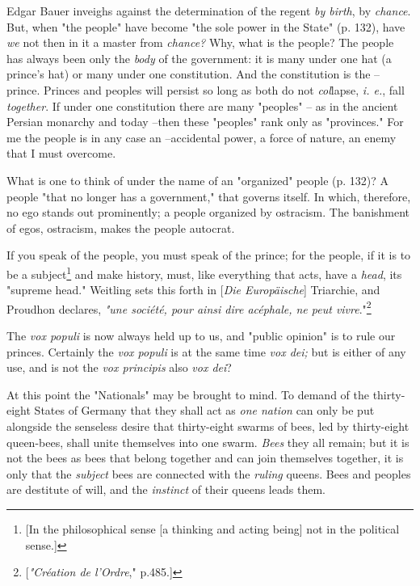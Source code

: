 Edgar Bauer inveighs against the determination of the regent \textit{by 
birth}, by \textit{chance}. But, when "{}the people"{} have become "{}the sole 
power in the State"{} (p. 132), have \textit{we} not then in it a master from 
\textit{chance?} Why, what is the people? The people has always been only the 
\textit{body} of the government: it is many under one hat (a prince's hat) or 
many under one constitution. And the constitution is the -- prince. Princes 
and peoples will persist so long as both do not \textit{col}lapse, \textit{i. 
e.}, fall \textit{together}. If under one constitution there are many 
"{}peoples"{} -- as in the ancient Persian monarchy and today --then these 
"{}peoples"{} rank only as "{}provinces."{} For me the people is in any case 
an --accidental power, a force of nature, an enemy that I must overcome.

What is one to think of under the name of an "{}organized"{} people (p. 132)? 
A people "{}that no longer has a government,"{} that governs itself. In which, 
therefore, no ego stands out prominently; a people organized by ostracism. The 
banishment of egos, ostracism, makes the people autocrat.

If you speak of the people, you must speak of the prince; for the people, if 
it is to be a subject\footnote{[In the philosophical sense [a thinking and 
acting being] not in the political sense.]} and make history, must, like 
everything that acts, have a \textit{head}, its "{}supreme head."{} Weitling 
sets this forth in [\textit{Die Europ\"aische}] Triarchie, and Proudhon 
declares, \textit{"{}une soci\'et\'e, pour ainsi dire ac\'ephale, ne peut 
vivre}."{}\footnote{[\textit{"{}Cr\'eation de l'Ordre},"{} p.485.]}

The \textit{vox populi} is now always held up to us, and "{}public opinion"{} 
is to rule our princes. Certainly the \textit{vox populi} is at the same time 
\textit{vox dei;} but is either of any use, and is not the \textit{vox 
principis} also \textit{vox dei}?

At this point the "{}Nationals"{} may be brought to mind. To demand of the 
thirty-eight States of Germany that they shall act as \textit{one nation} can 
only be put alongside the senseless desire that thirty-eight swarms of bees, 
led by thirty-eight queen-bees, shall unite themselves into one swarm. 
\textit{Bees} they all remain; but it is not the bees as bees that belong 
together and can join themselves together, it is only that the 
\textit{subject} bees are connected with the \textit{ruling} queens. Bees and 
peoples are destitute of will, and the \textit{instinct} of their queens leads 
them.

